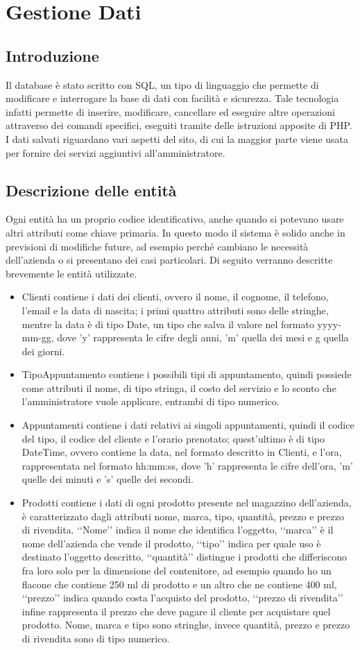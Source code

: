 \section{Gestione Dati}{
	\subsection{Introduzione}{
		Il database è stato scritto con SQL, un tipo di linguaggio che permette di modificare e interrogare la base di dati con facilità e sicurezza. Tale tecnologia infatti permette di inserire, modificare, cancellare ed eseguire altre operazioni attraverso dei comandi specifici, eseguiti tramite delle istruzioni apposite di PHP. I dati salvati riguardano vari aspetti del sito, di cui la maggior parte viene usata per fornire dei servizi aggiuntivi all'amministratore.
	}
	\subsection{Descrizione delle entità}{
		Ogni entità ha un proprio codice identificativo, anche quando si potevano usare altri attributi come chiave primaria. In questo modo il sistema è solido anche in previsioni di modifiche future, ad esempio perché cambiano le necessità dell'azienda o si presentano dei casi particolari. Di seguito verranno descritte brevemente le entità utilizzate.
		\begin{itemize}
		\item Clienti contiene i dati dei clienti, ovvero il nome, il cognome, il telefono, l'email e la data di nascita; i primi quattro attributi sono delle stringhe, mentre la data è di tipo Date, un tipo che salva il valore nel formato yyyy-mm-gg, dove 'y' rappresenta le cifre degli anni, 'm' quella dei mesi e g quella dei giorni.
		\item TipoAppuntamento contiene i possibili tipi di appuntamento, quindi possiede come attributi il nome, di tipo stringa, il costo del servizio e lo sconto che l'amministratore vuole applicare, entrambi di tipo numerico.
		\item Appuntamenti contiene i dati relativi ai singoli appuntamenti, quindi il codice del tipo, il codice del cliente e l'orario prenotato; quest'ultimo è di tipo DateTime, ovvero contiene la data, nel formato descritto in Clienti, e l'ora, rappresentata nel formato hh:mm:ss, dove 'h' rappresenta le cifre dell'ora, 'm' quelle dei minuti e 's' quelle dei secondi.
		\item Prodotti contiene i dati di ogni prodotto presente nel magazzino dell'azienda, è caratterizzato dagli attributi nome, marca, tipo, quantità, prezzo e prezzo di rivendita. ‘‘Nome’’ indica il nome che identifica l'oggetto, ‘‘marca’’ è il nome dell'azienda che vende il prodotto, ‘‘tipo’’ indica per quale uso è destinato l'oggetto descritto, ‘‘quantità’’ distingue i prodotti che differiscono fra loro solo per la dimensione del contenitore, ad esempio quando ho un flacone che contiene 250 ml di prodotto e un altro che ne contiene 400 ml, ‘‘prezzo’’ indica quando costa l'acquisto del prodotto, ‘‘prezzo di rivendita’’ infine rappresenta il prezzo che deve pagare il cliente per acquistare quel prodotto. Nome, marca e tipo sono stringhe, invece quantità, prezzo e prezzo di rivendita sono di tipo numerico. 

\end{itemize}}}
